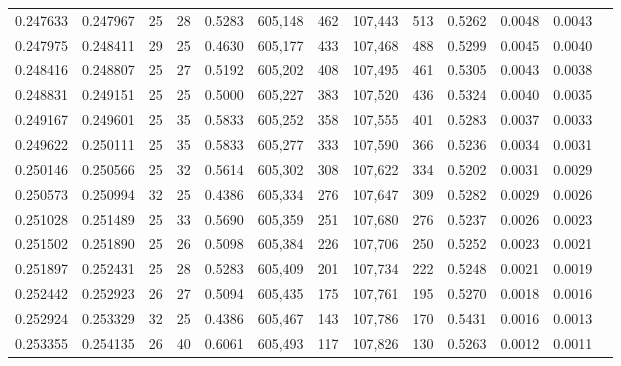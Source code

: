 \begin{tabular}{rrrrrrrrrrrrr}
0.247633 & 0.247967 &  25 &  28 &                                     0.5283 & 605,148 &     462 & 107,443 &     513 & 0.5262 & 0.0048 & 0.0043 \\
0.247975 & 0.248411 &  29 &  25 &                                     0.4630 & 605,177 &     433 & 107,468 &     488 & 0.5299 & 0.0045 & 0.0040 \\
0.248416 & 0.248807 &  25 &  27 &                                     0.5192 & 605,202 &     408 & 107,495 &     461 & 0.5305 & 0.0043 & 0.0038 \\
0.248831 & 0.249151 &  25 &  25 &                                     0.5000 & 605,227 &     383 & 107,520 &     436 & 0.5324 & 0.0040 & 0.0035 \\
0.249167 & 0.249601 &  25 &  35 &                                     0.5833 & 605,252 &     358 & 107,555 &     401 & 0.5283 & 0.0037 & 0.0033 \\
0.249622 & 0.250111 &  25 &  35 &                                     0.5833 & 605,277 &     333 & 107,590 &     366 & 0.5236 & 0.0034 & 0.0031 \\
0.250146 & 0.250566 &  25 &  32 &                                     0.5614 & 605,302 &     308 & 107,622 &     334 & 0.5202 & 0.0031 & 0.0029 \\
0.250573 & 0.250994 &  32 &  25 &                                     0.4386 & 605,334 &     276 & 107,647 &     309 & 0.5282 & 0.0029 & 0.0026 \\
0.251028 & 0.251489 &  25 &  33 &                                     0.5690 & 605,359 &     251 & 107,680 &     276 & 0.5237 & 0.0026 & 0.0023 \\
0.251502 & 0.251890 &  25 &  26 &                                     0.5098 & 605,384 &     226 & 107,706 &     250 & 0.5252 & 0.0023 & 0.0021 \\
0.251897 & 0.252431 &  25 &  28 &                                     0.5283 & 605,409 &     201 & 107,734 &     222 & 0.5248 & 0.0021 & 0.0019 \\
0.252442 & 0.252923 &  26 &  27 &                                     0.5094 & 605,435 &     175 & 107,761 &     195 & 0.5270 & 0.0018 & 0.0016 \\
0.252924 & 0.253329 &  32 &  25 &                                     0.4386 & 605,467 &     143 & 107,786 &     170 & 0.5431 & 0.0016 & 0.0013 \\
0.253355 & 0.254135 &  26 &  40 &                                     0.6061 & 605,493 &     117 & 107,826 &     130 & 0.5263 & 0.0012 & 0.0011 \\

\end{tabular}

